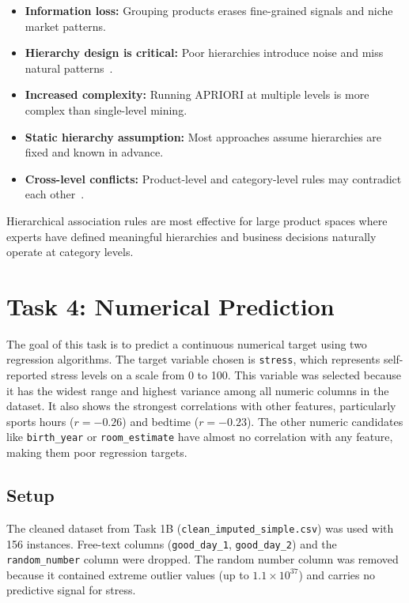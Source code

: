 \documentclass[runningheads]{llncs}
\begin{document}
\begin{itemize}
\item \textbf{Information loss:} Grouping products erases fine-grained signals and niche market patterns.
\item \textbf{Hierarchy design is critical:} Poor hierarchies introduce noise and miss natural patterns~\cite{srikant_1997}.
\item \textbf{Increased complexity:} Running APRIORI at multiple levels is more complex than single-level mining.
\item \textbf{Static hierarchy assumption:} Most approaches assume hierarchies are fixed and known in advance.
\item \textbf{Cross-level conflicts:} Product-level and category-level rules may contradict each other~\cite{srikant_1997}.
\end{itemize}

Hierarchical association rules are most effective for large product spaces where experts have defined meaningful hierarchies and business decisions naturally operate at category levels.


\section{Task 4: Numerical Prediction}
The goal of this task is to predict a continuous numerical target using two regression algorithms. The target variable chosen is \texttt{stress}, which represents self-reported stress levels on a scale from 0 to 100. This variable was selected because it has the widest range and highest variance among all numeric columns in the dataset. It also shows the strongest correlations with other features, particularly sports hours ($r = -0.26$) and bedtime ($r = -0.23$). The other numeric candidates like \texttt{birth\_year} or \texttt{room\_estimate} have almost no correlation with any feature, making them poor regression targets.

\subsection*{Setup}

The cleaned dataset from Task 1B (\texttt{clean\_imputed\_simple.csv}) was used with 156 instances. Free-text columns (\texttt{good\_day\_1}, \texttt{good\_day\_2}) and the \texttt{random\_number} column were dropped. The random number column was removed because it contained extreme outlier values (up to $1.1 \times 10^{37}$) and carries no predictive signal for stress.
\end{document}

